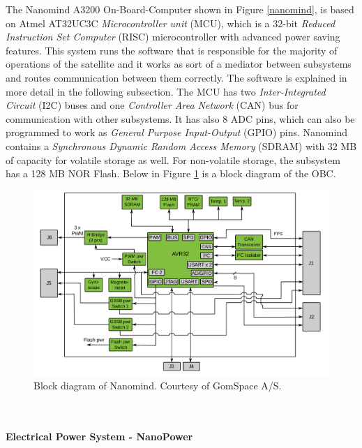 \documentclass[english,12pt,a4paper,pdftex,elec,utf8]{aaltothesis}
\begin{document}
The Nanomind A3200 On-Board-Computer shown in Figure \ref{nanomind}, is based on Atmel AT32UC3C \textit{Microcontroller unit} (MCU), which is a 32-bit \textit{Reduced Instruction Set Computer} (RISC) microcontroller with advanced power saving features. This system runs the software that is responsible for the majority of operations of the satellite and it works as sort of a mediator between subsystems and routes communication between them correctly. The software is explained in more detail in the following subsection. The MCU has two \textit{Inter-Integrated Circuit} (I2C) buses and one \textit{Controller Area Network} (CAN) bus for communication with other subsystems. It has also 8 ADC pins, which can also be programmed to work as \textit{General Purpose Input-Output} (GPIO) pins. Nanomind contains a \textit{Synchronous Dynamic Random Access Memory} (SDRAM) with 32 MB of capacity for volatile storage as well. For non-volatile storage, the subsystem has a 128 MB NOR Flash. Below in Figure \ref{nanomindblock} is a block diagram of the OBC. \cite{nanomindds}
\begin{figure}[h!]
\centering
\includegraphics[scale=0.4]{nanomind_block}
\caption{Block diagram of Nanomind. Courtesy of GomSpace A/S. \cite{nanomindds}}
\label{nanomindblock}
\end{figure}
\\
\\
\textbf{Electrical Power System - NanoPower}\\
\end{document}
